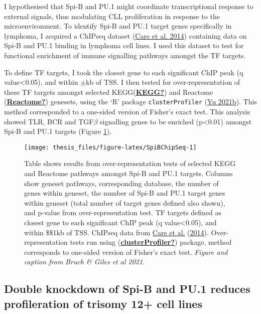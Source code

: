 \documentclass[11pt, a4paper, twosided]{book}
\begin{document}
I hypothesised that Spi-B and PU.1 might coordinate transcriptional response to external signals, thus modulating CLL proliferation in response to the microenvironment. To identify Spi-B and PU.1 target genes specifically in lymphoma, I acquired a ChIPseq dataset (\protect\hyperlink{ref-Care2014}{Care et al. 2014}) containing data on Spi-B and PU.1 binding in lymphoma cell lines. I used this dataset to test for functional enrichment of immune signalling pathways amongst the TF targets.

To define TF targets, I took the closest gene to each significant ChIP peak (q value\textless0.05), and within \(\pm\)kb of TSS. I then tested for over-representation of these TF targets amongst selected KEGG(\protect\hyperlink{ref-KEGG}{\textbf{KEGG?}}) and Reactome (\protect\hyperlink{ref-Reactome}{\textbf{Reactome?}}) genesets, using the `R' package \texttt{clusterProfiler} (\protect\hyperlink{ref-R-clusterProfiler}{Yu 2021b}). This method corresponded to a one-sided version of Fisher's exact test. This analysis showed TLR, BCR and TGF\(\beta\) signalling genes to be enriched (p\textless0.01) amongst Spi-B and PU.1 targets (Figure \ref{fig:SpiBChipSeq}).


\begin{figure}

{\centering \texttt{[image: thesis\_files/figure-latex/SpiBChipSeq-1]} 

}

\caption{Table shows results from over-representation tests of selected KEGG and Reactome pathways amongst Spi-B and PU.1 targets. Columns show geneset pathways, corresponding database, the number of genes within geneset, the number of Spi-B and PU.1 target genes within geneset (total number of target genes defined also shown), and p-value from over-representation test. TF targets defined as closest gene to each significant ChIP peak (q value\textless0.05), and within \$\pm\$1kb of TSS. ChIPseq data from \protect\hyperlink{ref-Care2014}{Care et al.} (\protect\hyperlink{ref-Care2014}{2014}). Over-representation tests run using (\protect\hyperlink{ref-clusterProfiler}{\textbf{clusterProfiler?}}) package, method corresponds to one-sided version of Fisher's exact test. \emph{Figure and caption from Bruch \& Giles et al 2021.}}\label{fig:SpiBChipSeq}
\end{figure}
\hypertarget{double-knockdown-of-spi-b-and-pu.1-reduces-profileration-of-trisomy-12-cell-lines}{%
\subsection{Double knockdown of Spi-B and PU.1 reduces profileration of trisomy 12+ cell lines}\label{double-knockdown-of-spi-b-and-pu.1-reduces-profileration-of-trisomy-12-cell-lines}}
\end{document}
